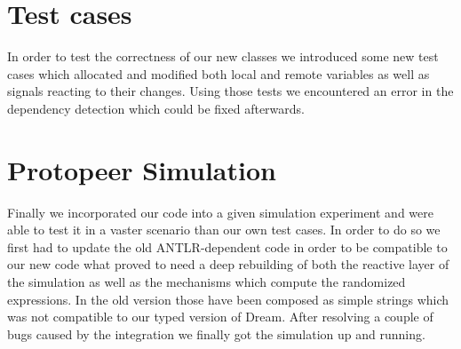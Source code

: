 \documentclass[11pt]{article}
\begin{document}
\section{Test cases}
In order to test the correctness of our new classes we introduced some new test cases which allocated and modified both local and remote variables as well as signals reacting to their changes.
Using those tests we encountered an error in the dependency detection which could be fixed afterwards.

\section{Protopeer Simulation}
Finally we incorporated our code into a given simulation experiment and were able to test it in a vaster scenario than our own test cases.
In order to do so we first had to update the old ANTLR-dependent code in order to be compatible to our new code what proved to need a deep rebuilding of both the reactive layer of the simulation as well as the mechanisms which compute the randomized expressions.
In the old version those have been composed as simple strings which was not compatible to our typed version of Dream.
After resolving a couple of bugs caused by the integration we finally got the simulation up and running.
\end{document}

